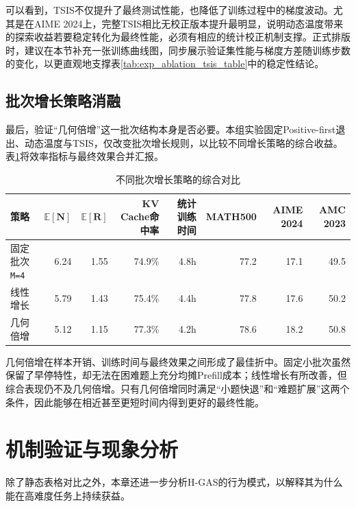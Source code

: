可以看到，TSIS不仅提升了最终测试性能，也降低了训练过程中的梯度波动。尤其是在AIME 2024上，完整TSIS相比无校正版本提升最明显，说明动态温度带来的探索收益若要稳定转化为最终性能，必须有相应的统计校正机制支撑。正式排版时，建议在本节补充一张训练曲线图，同步展示验证集性能与梯度方差随训练步数的变化，以更直观地支撑表\ref{tab:exp_ablation_tsis_table}中的稳定性结论。

\subsection{批次增长策略消融}
\label{subsec:exp_ablation_batch_growth}

最后，验证“几何倍增”这一批次结构本身是否必要。本组实验固定Positive-first退出、动态温度与TSIS，仅改变批次增长规则，以比较不同增长策略的综合收益。表\ref{tab:exp_ablation_batch_growth_table}将效率指标与最终效果合并汇报。

\begin{table}[htbp]
    \centering
    \caption{不同批次增长策略的综合对比}\label{tab:exp_ablation_batch_growth_table}
    \small
    \setlength{\tabcolsep}{3.0pt}
    \renewcommand{\arraystretch}{1.15}
    \begin{tabular}{|l|r|r|r|r|r|r|r|}
    \hline
    \textbf{策略} & $\boldsymbol{\mathbb{E}[N]}$ & $\boldsymbol{\mathbb{E}[R]}$ & \textbf{KV Cache命中率} & \textbf{统计训练时间} & \textbf{MATH500} & \textbf{AIME 2024} & \textbf{AMC 2023} \\
    \hline
    固定批次\texttt{M=4} & 6.24 & 1.55 & 74.9\% & 4.8h & 77.2 & 17.1 & 49.5 \\
    线性增长            & 5.79 & 1.43 & 75.4\% & 4.4h & 77.8 & 17.6 & 50.2 \\
    几何倍增            & 5.12 & 1.15 & 77.3\% & 4.2h & 78.6 & 18.2 & 50.8 \\
    \hline
    \end{tabular}
\end{table}

几何倍增在样本开销、训练时间与最终效果之间形成了最佳折中。固定小批次虽然保留了早停特性，却无法在困难题上充分均摊Prefill成本；线性增长有所改善，但综合表现仍不及几何倍增。只有几何倍增同时满足“小题快退”和“难题扩展”这两个条件，因此能够在相近甚至更短时间内得到更好的最终性能。

\section{机制验证与现象分析}
\label{sec:exp_mechanism}

除了静态表格对比之外，本章还进一步分析H-GAS的行为模式，以解释其为什么能在高难度任务上持续获益。

